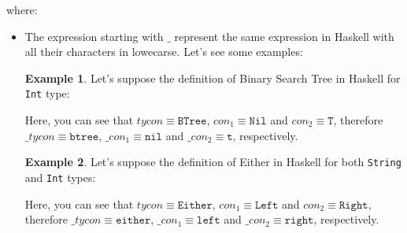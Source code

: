 \documentclass{report}
\theoremstyle{definition}
\newtheorem{example}{Example}[section]
\theoremstyle{definition}
\newcommand{\ttt}[1]{\texttt{#1}}
\begin{document}
where:
\begin{itemize}
	\item The expression starting with $\_$ represent the same expression in Haskell with all their characters in lowecarse. Let's see some examples:
	      	      
	      \begin{example}
	      	Let's suppose the definition of Binary Search Tree in Haskell for \ttt{Int} type:
	      	
	      	Here, you can see that $tycon \equiv \ttt{BTree}$, $con_1 \equiv \ttt{Nil}$ and $con_2 \equiv \ttt{T}$, therefore $\_tycon \equiv \ttt{btree}$, $\_con_1 \equiv \ttt{nil}$ and $\_con_2 \equiv \ttt{t}$, respectively.
	      \end{example}
	      \begin{example}
	      	Let's suppose the definition of Either in Haskell for both \ttt{String} and \ttt{Int} types:
	      	
	      	Here, you can see that $tycon \equiv \ttt{Either}$, $con_1 \equiv \ttt{Left}$ and $con_2 \equiv \ttt{Right}$, therefore $\_tycon \equiv \ttt{either}$, $\_con_1 \equiv \ttt{left}$ and $\_con_2 \equiv \ttt{right}$, respectively.
	      \end{example}
	      

\end{itemize}
\end{document}
